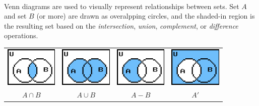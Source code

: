 \documentclass[a4paper,12pt]{book}
\begin{document}
\begin{intro}{\ }
            ~\\
            Venn diagrams are used to visually represent relationships
            between sets. Set $A$ and set $B$ (or more) are drawn
            as overalpping circles, and the shaded-in region is the
            resulting set based on the \textit{intersection},
            \textit{union}, \textit{complement}, or \textit{difference}
            operations.

            \begin{center}
                \begin{tabular}{c c c c}
                    \includegraphics[width=2.5cm]{images/3-1-intersection.png}
                    &
                    \includegraphics[width=2.5cm]{images/3-1-union.png}
                    &
                    \includegraphics[width=2.5cm]{images/3-1-difference.png}
                    &
                    \includegraphics[width=2.5cm]{images/3-1-complement.png}
                    \\
                    $A \cap B$ &
                    $A \cup B$ &
                    $A - B$ &
                    $A'$
                \end{tabular}
            \end{center}

        \end{intro}

        \newpage
\end{document}
